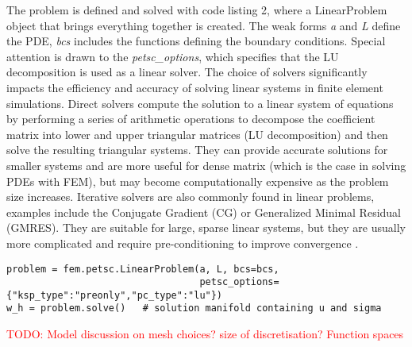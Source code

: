 The problem is defined and solved with code listing 2, where a LinearProblem object that brings everything together is created. The weak forms \textit{a} and \textit{L} define the PDE, \textit{bcs} includes the functions defining the boundary conditions. Special attention is drawn to the \textit{petsc\_options}, which specifies that the LU decomposition is used as a linear solver. The choice of solvers significantly impacts the efficiency and accuracy of solving linear systems in finite element simulations. Direct solvers compute the solution to a linear system of equations by performing a series of arithmetic operations to decompose the coefficient matrix into lower and upper triangular matrices (LU decomposition) and then solve the resulting triangular systems. They can provide accurate solutions for smaller systems and are more useful for dense matrix (which is the case in solving PDEs with FEM), but may become computationally expensive as the problem size increases. Iterative solvers are also commonly found in linear problems, examples include the Conjugate Gradient (CG) or Generalized Minimal Residual (GMRES). They are suitable for large, sparse linear systems, but they are usually more complicated and require pre-conditioning to improve convergence \cite{Betcke_Scroggs}.

\begin{lstlisting}[frame=single, caption={Defining and solving the porblem}, basicstyle=\scriptsize]
problem = fem.petsc.LinearProblem(a, L, bcs=bcs, 
                                  petsc_options={"ksp_type":"preonly","pc_type":"lu"})
w_h = problem.solve()   # solution manifold containing u and sigma
\end{lstlisting}

\vspace{1cm}

\textcolor{red}{TODO: Model discussion on mesh choices? size of discretisation? Function spaces}

\newpage